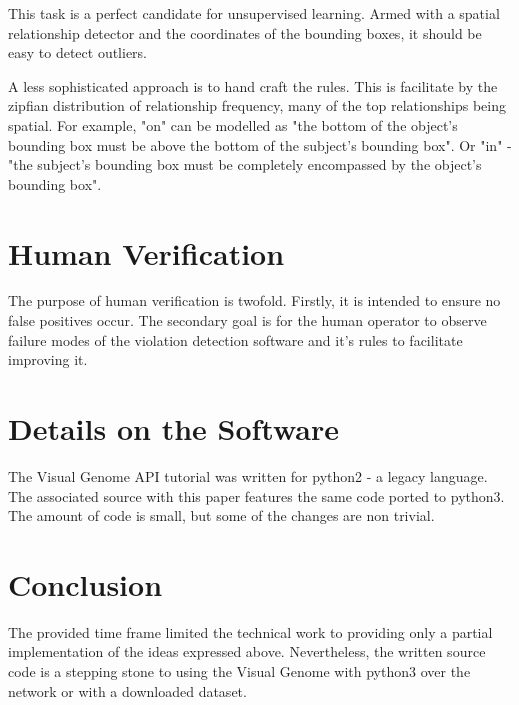 \documentclass{article}
\begin{document}
This task is a perfect candidate for unsupervised learning.
Armed with a spatial relationship detector and the coordinates of the bounding boxes, it should be easy to detect outliers.

A less sophisticated approach is to hand craft the rules.
This is facilitate by the zipfian distribution of relationship frequency, many of the top relationships being spatial.\cite{krishna} 
For example, "on" can be modelled as "the bottom of the object's bounding box must be above the bottom of the subject's bounding box".
Or "in" - "the subject's bounding box must be completely encompassed by the object's bounding box".


\section{Human Verification}
The purpose of human verification is twofold.
Firstly, it is intended to ensure no false positives occur.
The secondary goal is for the human operator to observe failure modes of the violation detection software and it's rules to facilitate improving it.


\section{Details on the Software}
The Visual Genome API tutorial was written for python2 - a legacy language.
The associated source with this paper features the same code ported to python3.
The amount of code is small, but some of the changes are non trivial.


\section{Conclusion}
The provided time frame limited the technical work to providing only a partial implementation of the ideas expressed above.
Nevertheless, the written source code is a stepping stone to using the Visual Genome with python3 over the network or with a downloaded dataset.


\printbibliography
\end{document}

